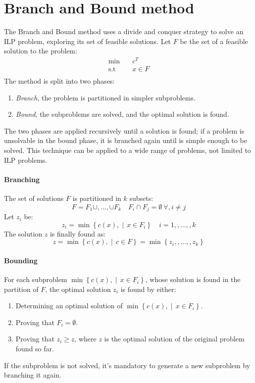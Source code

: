 \section{Branch and Bound method}
The Branch and Bound method uses a divide and conquer strategy to solve an ILP problem, exploring its set of feasible solutions.
Let $F$ be the set of a feasible solution to the problem:
\begin{align*}
    \min       \quad & c^T     \\
    \text{s.t} \quad & x \in F \\
\end{align*}
The method is split into two phases:
\begin{enumerate}
    \item \textit{Branch}, the problem is partitioned in simpler subproblems.
    \item \textit{Bound}, the subproblems are solved, and the optimal solution is found.
\end{enumerate}

The two phases are applied recursively until a solution is found;
if a problem is unsolvable in the bound phase, it is branched again until is simple enough to be solved.
This technique can be applied to a wide range of problems, not limited to ILP problems.

\paragraph*{Branching}
The set of solutions $F$ is partitioned in $k$ subsets:
\[ F = F_1 \cup,  \ldots,  \cup F_k \quad F_i \cap F_j = \emptyset \ \forall,  i \neq j \]
Let $z_i$ be:
\[ z_i = \min\left\{ c(x), \middle\vert\, x \in F_i \right\} \quad i = 1,,  \ldots,  , k \]
The solution $z$ is finally found as:
\[ z = \min\left\{ c(x), \middle\vert\, c \in F \right\} = \min\left\{ z_i,,  \ldots, , z_k \right\} \]

\paragraph*{Bounding}
For each subproblem $\min\left\{ c(x), \middle\vert\, x \in F_i \right\}$, whose solution is found in the partition of $F$, the optimal solution $z_i$ is found by either:
\begin{enumerate}
    \item Determining an optimal solution of $\min\left\{ c(x), \middle\vert\, x \in F_i \right\}$.
    \item Proving that $F_i = \emptyset$.
    \item Proving that $z_i \geq z$, where $z$ is the optimal solution of the original problem found so far.
\end{enumerate}
If the subproblem is not solved, it's mandatory to generate a new subproblem by branching it again.

